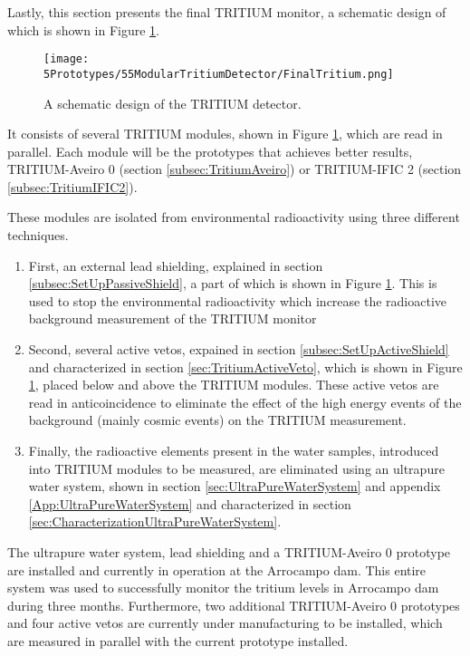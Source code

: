 Lastly, this section presents the final TRITIUM monitor, a schematic design of which is shown in Figure \ref{fig:TritiumDetectorSchematicDesign}.

\begin{figure}[h]
\centering
\texttt{[image: 5Prototypes/55ModularTritiumDetector/FinalTritium.png]}
\caption{A schematic design of the TRITIUM detector.\label{fig:TritiumDetectorSchematicDesign}}
\end{figure}

It consists of several TRITIUM modules, shown in Figure \ref{fig:TritiumDetectorSchematicDesign}, which are read in parallel. Each module will be the prototypes that achieves better results, TRITIUM-Aveiro 0 (section \ref{subsec:TritiumAveiro}) or TRITIUM-IFIC 2 (section \ref{subsec:TritiumIFIC2}).

These modules are isolated from environmental radioactivity using three different techniques.

\begin{enumerate}

\item{} First, an external lead shielding, explained in section \ref{subsec:SetUpPassiveShield}, a part of which is shown in Figure \ref{fig:TritiumDetectorSchematicDesign}. This is used to stop the environmental radioactivity which increase the radioactive background measurement of the TRITIUM monitor

\item{} Second, several active vetos, expained in section \ref{subsec:SetUpActiveShield} and characterized in section \ref{sec:TritiumActiveVeto}, which is shown in Figure \ref{fig:TritiumDetectorSchematicDesign}, placed below and above the TRITIUM modules. These active vetos are read in anticoincidence to eliminate the effect of the high energy events of the background (mainly cosmic events) on the TRITIUM measurement.

\item{} Finally, the radioactive elements present in the water samples, introduced into TRITIUM modules to be measured, are eliminated using an ultrapure water system, shown in section \ref{sec:UltraPureWaterSystem} and appendix \ref{App:UltraPureWaterSystem} and characterized in section \ref{sec:CharacterizationUltraPureWaterSystem}.

\end{enumerate}

The ultrapure water system, lead shielding and a TRITIUM-Aveiro 0 prototype are installed and currently in operation at the Arrocampo dam. This entire system was used to successfully monitor the tritium levels in Arrocampo dam during three months. Furthermore, two additional TRITIUM-Aveiro 0 prototypes and four active vetos are currently under manufacturing to be installed, which are measured in parallel with the current prototype installed.

